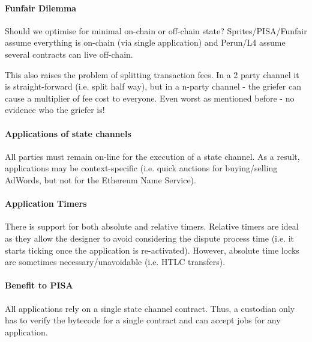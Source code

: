 \documentclass{llncs}
\begin{document}
\paragraph{Funfair Dilemma} Should we optimise for minimal on-chain or off-chain state? Sprites/PISA/Funfair assume everything is on-chain (via single application) and Perun/L4 assume several contracts can live off-chain. 

This also raises the problem of splitting transaction fees. In a 2 party channel it is straight-forward (i.e. split half way), but in a n-party channel - the griefer can cause a multiplier of fee cost to everyone. Even worst as mentioned before - no evidence who the griefer is! 

\paragraph{Applications of state channels} All parties must remain on-line for the execution of a state channel. As a result, applications may be context-specific (i.e. quick auctions for buying/selling AdWords, but not for the Ethereum Name Service). 

\paragraph{Application Timers} There is support for both absolute and relative timers. Relative timers are ideal as they allow the designer to avoid considering the dispute process time (i.e. it starts ticking once the application is re-activated). However, absolute time locks are sometimes necessary/unavoidable (i.e. HTLC transfers). 

\paragraph{Benefit to PISA} All applications rely on a single state channel contract. Thus, a custodian only has to verify the bytecode for a single contract and can accept jobs for any application. 

\appendix
\end{document}
